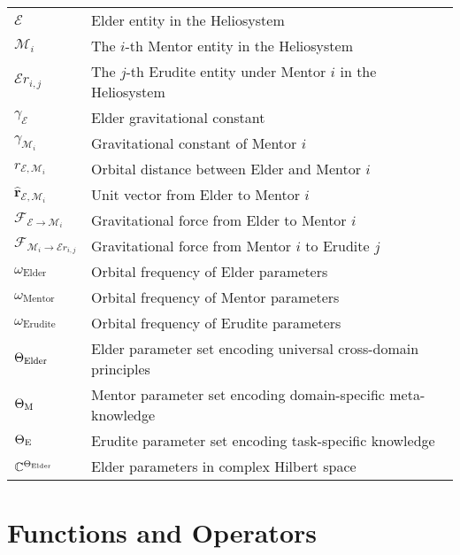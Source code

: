 \begin{tabular}{p{3cm} p{12cm}}
$\mathcal{E}$ & Elder entity in the Heliosystem \\
$\mathcal{M}_i$ & The $i$-th Mentor entity in the Heliosystem \\
$\mathcal{E}r_{i,j}$ & The $j$-th Erudite entity under Mentor $i$ in the Heliosystem \\
$\gamma_{\mathcal{E}}$ & Elder gravitational constant \\
$\gamma_{\mathcal{M}_i}$ & Gravitational constant of Mentor $i$ \\
$r_{\mathcal{E},\mathcal{M}_i}$ & Orbital distance between Elder and Mentor $i$ \\
$\mathbf{\hat{r}}_{\mathcal{E},\mathcal{M}_i}$ & Unit vector from Elder to Mentor $i$ \\
$\mathcal{F}_{\mathcal{E} \rightarrow \mathcal{M}_i}$ & Gravitational force from Elder to Mentor $i$ \\
$\mathcal{F}_{\mathcal{M}_i \rightarrow \mathcal{E}r_{i,j}}$ & Gravitational force from Mentor $i$ to Erudite $j$ \\
$\omega_{\text{Elder}}$ & Orbital frequency of Elder parameters \\
$\omega_{\text{Mentor}}$ & Orbital frequency of Mentor parameters \\
$\omega_{\text{Erudite}}$ & Orbital frequency of Erudite parameters \\
$\Theta_{\text{Elder}}$ & Elder parameter set encoding universal cross-domain principles \\
$\Theta_{\text{M}}$ & Mentor parameter set encoding domain-specific meta-knowledge \\
$\Theta_{\text{E}}$ & Erudite parameter set encoding task-specific knowledge \\
$\mathbb{C}^{\Theta_{\text{Elder}}}$ & Elder parameters in complex Hilbert space \\
\end{tabular}

\section*{Functions and Operators}


